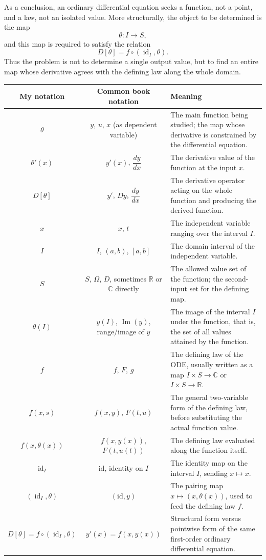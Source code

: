 \documentclass[12pt]{article}
\begin{document}
	As a conclusion, an ordinary differential equation seeks a function, not a point, and a law, not an isolated value. More structurally, the object to be determined is the map
	$$
	\theta:I\to S,
	$$
	and this map is required to satisfy the relation
	$$
	D[\theta]=f\circ(\operatorname{id}_I,\theta).
	$$
	Thus the problem is not to determine a single output value, but to find an entire map whose derivative agrees with the defining law along the whole domain.
	
	\begin{center}
		\renewcommand{\arraystretch}{1.2}
		\begin{tabular}{|c|c|p{7.2cm}|}
			\hline
			\textbf{My notation} & \textbf{Common book notation} & \textbf{Meaning} \\
			\hline
			\(\theta\) & \(y\), \(u\), \(x\) (as dependent variable) & The main function being studied; the map whose derivative is constrained by the differential equation. \\
			\hline
			\(\theta'(x)\) & \(y'(x)\), \(\dfrac{dy}{dx}\) & The derivative value of the function at the input \(x\). \\
			\hline
			\(D[\theta]\) & \(y'\), \(Dy\), \(\dfrac{dy}{dx}\) & The derivative operator acting on the whole function and producing the derived function. \\
			\hline
			\(x\) & \(x\), \(t\) & The independent variable ranging over the interval \(I\). \\
			\hline
			\(I\) & \(I\), \((a,b)\), \([a,b]\) & The domain interval of the independent variable. \\
			\hline
			\(S\) & \(S\), \(\Omega\), \(D\), sometimes \( \mathbb{R} \) or \( \mathbb{C} \) directly & The allowed value set of the function; the second-input set for the defining map. \\
			\hline
			\(\theta(I)\) & \(y(I)\), \(\operatorname{Im}(y)\), range/image of \(y\) & The image of the interval \(I\) under the function, that is, the set of all values attained by the function. \\
			\hline
			\(f\) & \(f\), \(F\), \(g\) & The defining law of the ODE, usually written as a map \(I\times S\to\mathbb{C}\) or \(I\times S\to\mathbb{R}\). \\
			\hline
			\(f(x,s)\) & \(f(x,y)\), \(F(t,u)\) & The general two-variable form of the defining law, before substituting the actual function value. \\
			\hline
			\(f(x,\theta(x))\) & \(f(x,y(x))\), \(F(t,u(t))\) & The defining law evaluated along the function itself. \\
			\hline
			\(\operatorname{id}_I\) & \(\mathrm{id}\), identity on \(I\) & The identity map on the interval \(I\), sending \(x\mapsto x\). \\
			\hline
			\((\operatorname{id}_I,\theta)\) & \((\mathrm{id},y)\) & The pairing map \(x\mapsto (x,\theta(x))\), used to feed the defining law \(f\). \\
			\hline
			\(D[\theta]=f\circ(\operatorname{id}_I,\theta)\) & \(y'(x)=f(x,y(x))\) & Structural form versus pointwise form of the same first-order ordinary differential equation. \\
			\hline
		\end{tabular}
	\end{center}
\end{document}
